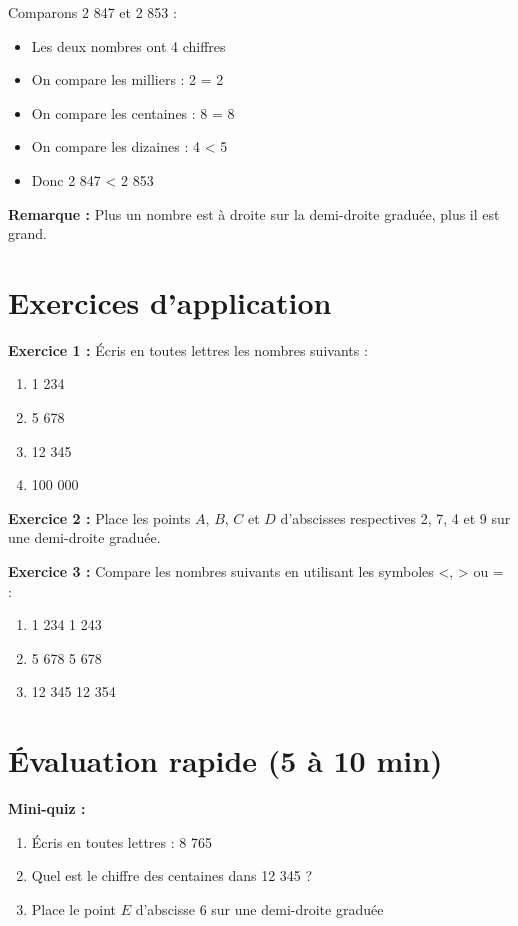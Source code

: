 \begin{examplebox}
	Comparons 2 847 et 2 853 :
	\begin{itemize}
		\item Les deux nombres ont 4 chiffres
		\item On compare les milliers : 2 = 2
		\item On compare les centaines : 8 = 8
		\item On compare les dizaines : 4 < 5
		\item Donc 2 847 < 2 853
	\end{itemize}
\end{examplebox}

\textbf{Remarque :} Plus un nombre est à droite sur la demi-droite graduée, plus il est grand.

\section{Exercices d'application}

\begin{exercisebox}
\textbf{Exercice 1 :} Écris en toutes lettres les nombres suivants :
\begin{enumerate}
	\item 1 234
	\item 5 678
	\item 12 345
	\item 100 000
\end{enumerate}
\end{exercisebox}

\begin{exercisebox}
\textbf{Exercice 2 :} Place les points $A$, $B$, $C$ et $D$ d'abscisses respectives 2, 7, 4 et 9 sur une demi-droite graduée.
\end{exercisebox}

\begin{exercisebox}
\textbf{Exercice 3 :} Compare les nombres suivants en utilisant les symboles <, > ou = :
\begin{enumerate}
	\item 1 234 \trous{1cm} 1 243
	\item 5 678 \trous{1cm} 5 678
	\item 12 345 \trous{1cm} 12 354
\end{enumerate}
\end{exercisebox}

\section{Évaluation rapide (5 à 10 min)}

\begin{exercisebox}
\textbf{Mini-quiz :}
\begin{enumerate}
	\item Écris en toutes lettres : 8 765
	\item Quel est le chiffre des centaines dans 12 345 ?
	\item Place le point $E$ d'abscisse 6 sur une demi-droite graduée
\end{enumerate}
\end{exercisebox}

